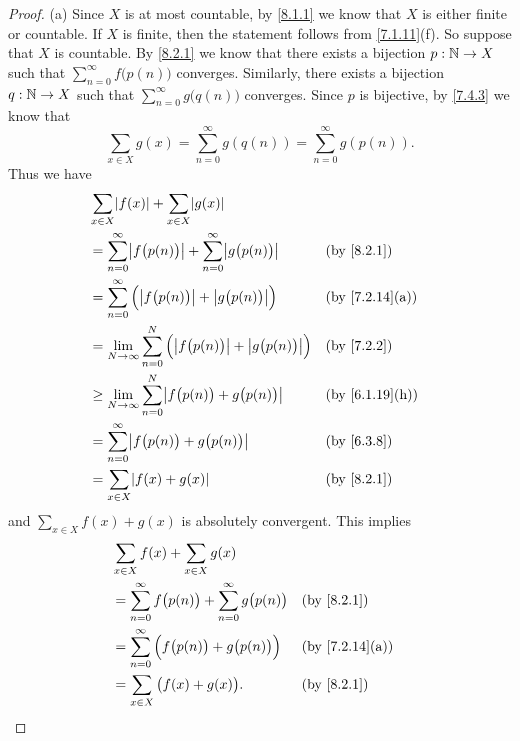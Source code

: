\begin{proof}{(a)}
  Since \(X\) is at most countable, by \cref{8.1.1} we know that \(X\) is either finite or countable.
  If \(X\) is finite, then the statement follows from \cref{7.1.11}(f).
  So suppose that \(X\) is countable.
  By \cref{8.2.1} we know that there exists a bijection \(p : \mathbb{N} \to X\) such that \(\sum_{n = 0}^\infty f\big(p(n)\big)\) converges.
  Similarly, there exists a bijection \(q : \mathbb{N} \to X\) such that \(\sum_{n = 0}^\infty g\big(q(n)\big)\) converges.
  Since \(p\) is bijective, by \cref{7.4.3} we know that
  \[
    \sum_{x \in X} g(x) = \sum_{n = 0}^\infty g(q(n)) = \sum_{n = 0}^\infty g(p(n)).
  \]
  Thus we have
  \begin{align*}
     & \sum_{x \in X} \abs{f(x)} + \sum_{x \in X} \abs{g(x)}                                                                          \\
     & = \sum_{n = 0}^\infty \abs{f\big(p(n)\big)} + \sum_{n = 0}^\infty \abs{g\big(p(n)\big)}      &  & \text{(by \cref{8.2.1})}     \\
     & = \sum_{n = 0}^\infty \Big(\abs{f\big(p(n)\big)} + \abs{g\big(p(n)\big)}\Big)                &  & \text{(by \cref{7.2.14}(a))} \\
     & = \lim_{N \to \infty} \sum_{n = 0}^N \Big(\abs{f\big(p(n)\big)} + \abs{g\big(p(n)\big)}\Big) &  & \text{(by \cref{7.2.2})}     \\
     & \geq \lim_{N \to \infty} \sum_{n = 0}^N \abs{f\big(p(n)\big) + g\big(p(n)\big)}              &  & \text{(by \cref{6.1.19}(h))} \\
     & = \sum_{n = 0}^\infty \abs{f\big(p(n)\big) + g\big(p(n)\big)}                                &  & \text{(by \cref{6.3.8})}     \\
     & = \sum_{x \in X} \abs{f(x) + g(x)}                                                           &  & \text{(by \cref{8.2.1})}
  \end{align*}
  and \(\sum_{x \in X} f(x) + g(x)\) is absolutely convergent.
  This implies
  \begin{align*}
     & \sum_{x \in X} f(x) + \sum_{x \in X} g(x)                                                                     \\
     & = \sum_{n = 0}^\infty f\big(p(n)\big) + \sum_{n = 0}^\infty g\big(p(n)\big) &  & \text{(by \cref{8.2.1})}     \\
     & = \sum_{n = 0}^\infty \Big(f\big(p(n)\big) + g\big(p(n)\big)\Big)           &  & \text{(by \cref{7.2.14}(a))} \\
     & = \sum_{x \in X} \big(f(x) + g(x)\big).                                     &  & \text{(by \cref{8.2.1})}
  \end{align*}
\end{proof}

